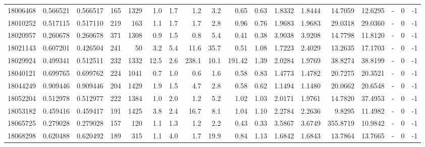 \begin{tabular}{rrrrrrrrrrrrrrrlrr}
  18006468 & 0.566521 &   0.566517 &  165 & 1329 &      1.0 &      1.7 &     1.2 &      3.2 &       0.65 &        0.63 &  1.8332 &  1.8444 &   14.7059 &   12.6295 &             - &        0 &         -1 \\
  18010252 & 0.517115 &   0.517110 &  219 &  163 &      1.1 &      1.7 &     1.7 &      2.8 &       0.96 &        0.76 &  1.9683 &  1.9683 &   29.0318 &   29.0360 &             - &        0 &         -1 \\
  18020957 & 0.260678 &   0.260678 &  371 & 1308 &      0.9 &      1.5 &     0.8 &      5.4 &       0.41 &        0.38 &  3.9038 &  3.9208 &   14.7798 &   11.8120 &             - &        0 &         -1 \\
  18021143 & 0.607201 &   0.426504 &  241 &   50 &      3.2 &      5.4 &    11.6 &     35.7 &       0.51 &        1.08 &  1.7223 &  2.4029 &   13.2635 &   17.1703 &             - &        0 &         -1 \\
  18029924 & 0.499341 &   0.512511 &  232 & 1332 &     12.5 &      2.6 &   238.1 &     10.1 &     191.42 &        1.39 &  2.0284 &  1.9769 &   38.8274 &   38.8199 &             - &        0 &         -1 \\
  18040121 & 0.699765 &   0.699762 &  224 & 1041 &      0.7 &      1.0 &     0.6 &      1.6 &       0.58 &        0.83 &  1.4773 &  1.4782 &   20.7275 &   20.3521 &             - &        0 &         -1 \\
  18044249 & 0.909446 &   0.909446 &  204 & 1429 &      1.9 &      1.5 &     4.7 &      2.8 &       0.58 &        0.62 &  1.1494 &  1.1480 &   20.0662 &   20.6548 &             - &        0 &         -1 \\
  18052204 & 0.512978 &   0.512977 &  222 & 1384 &      1.0 &      2.0 &     1.2 &      5.2 &       1.02 &        1.03 &  2.0171 &  1.9761 &   14.7820 &   37.4953 &             - &        0 &         -1 \\
  18053182 & 0.459416 &   0.459417 &  191 & 1425 &      3.8 &      2.4 &    16.7 &      8.1 &       1.04 &        1.10 &  2.2784 &  2.2636 &    9.8295 &   11.4982 &             - &        0 &         -1 \\
  18065725 & 0.279028 &   0.279028 &  157 &  120 &      1.1 &      1.3 &     1.2 &      2.2 &       0.43 &        0.33 &  3.5867 &  3.6749 &  355.8719 &   10.9842 &             - &        0 &         -1 \\
  18068298 & 0.620488 &   0.620492 &  189 &  315 &      1.1 &      4.0 &     1.7 &     19.9 &       0.84 &        1.13 &  1.6842 &  1.6843 &   13.7864 &   13.7665 &             - &        0 &         -1 \\

\end{tabular}
